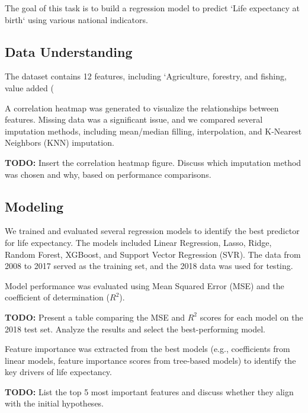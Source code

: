 \documentclass{article}
\begin{document}
The goal of this task is to build a regression model to predict `Life expectancy at birth` using various national indicators.

\subsection{Data Understanding}
\label{ssec:data_understanding}

The dataset contains 12 features, including `Agriculture, forestry, and fishing, value added (%

A correlation heatmap was generated to visualize the relationships between features. Missing data was a significant issue, and we compared several imputation methods, including mean/median filling, interpolation, and K-Nearest Neighbors (KNN) imputation.

\textbf{TODO:} Insert the correlation heatmap figure. Discuss which imputation method was chosen and why, based on performance comparisons.

\subsection{Modeling}
\label{ssec:modeling_life}

We trained and evaluated several regression models to identify the best predictor for life expectancy. The models included Linear Regression, Lasso, Ridge, Random Forest, XGBoost, and Support Vector Regression (SVR). The data from 2008 to 2017 served as the training set, and the 2018 data was used for testing.

Model performance was evaluated using Mean Squared Error (MSE) and the coefficient of determination ($R^2$).

\textbf{TODO:} Present a table comparing the MSE and $R^2$ scores for each model on the 2018 test set. Analyze the results and select the best-performing model.

Feature importance was extracted from the best models (e.g., coefficients from linear models, feature importance scores from tree-based models) to identify the key drivers of life expectancy.

\textbf{TODO:} List the top 5 most important features and discuss whether they align with the initial hypotheses.
\end{document}
